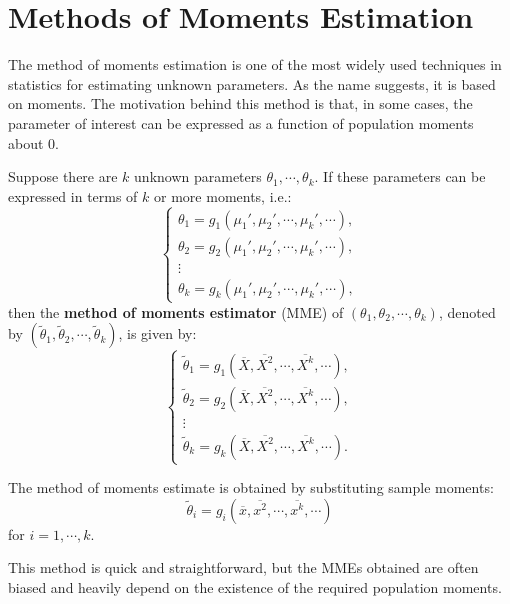 \documentclass{huhtakm-template-book-v2}
\begin{document}
\section{Methods of Moments Estimation}
    The method of moments estimation is one of the most widely used techniques in statistics for estimating unknown parameters. As the name suggests, it is based on moments. The motivation behind this method is that, in some cases, the parameter of interest can be expressed as a function of population moments about $0$.
    \begin{defn}
        Suppose there are $k$ unknown parameters $\theta_{1}, \cdots, \theta_{k}$. If these parameters can be expressed in terms of $k$ or more moments, i.e.:
        \begin{equation*}
            \begin{cases}
                \theta_{1} = g_{1}(\mu_{1}', \mu_{2}', \cdots, \mu_{k}', \cdots),\\
                \theta_{2} = g_{2}(\mu_{1}', \mu_{2}', \cdots, \mu_{k}', \cdots),\\
                \vdots\\
                \theta_{k} = g_{k}(\mu_{1}', \mu_{2}', \cdots, \mu_{k}', \cdots),
            \end{cases}
        \end{equation*}
        then the \textbf{method of moments estimator} (MME) of $(\theta_{1}, \theta_{2}, \cdots, \theta_{k})$, denoted by $(\widetilde{\theta}_{1}, \widetilde{\theta}_{2}, \cdots, \widetilde{\theta}_{k})$, is given by:
        \begin{equation*}
            \begin{cases}
                \widetilde{\theta}_{1} = g_{1}(\overline{X}, \overline{X^{2}}, \cdots, \overline{X^{k}}, \cdots),\\
                \widetilde{\theta}_{2} = g_{2}(\overline{X}, \overline{X^{2}}, \cdots, \overline{X^{k}}, \cdots),\\
                \vdots\\
                \widetilde{\theta}_{k} = g_{k}(\overline{X}, \overline{X^{2}}, \cdots, \overline{X^{k}}, \cdots).
            \end{cases}
        \end{equation*}
    \end{defn}
    \begin{rem}
        The method of moments estimate is obtained by substituting sample moments:
        \begin{equation*}
        	\widetilde{\theta}_{i} = g_{i}(\overline{x}, \overline{x^{2}}, \cdots, \overline{x^{k}}, \cdots)
        \end{equation*}
        for $i = 1, \cdots, k$.
    \end{rem}
    \begin{rem}
        This method is quick and straightforward, but the MMEs obtained are often biased and heavily depend on the existence of the required population moments.
    \end{rem}
    \newpage
    
\end{document}

